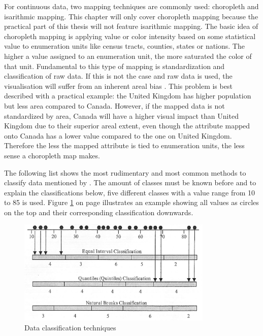 For continuous data, two mapping techniques are commonly used: choropleth and isarithmic mapping. This chapter will only cover choropleth mapping because the practical part of this thesis will not feature isarithmic mapping. The basic idea of choropleth mapping is applying value or color intensity based on some statistical value to enumeration units like census tracts, counties, states or nations. The higher a value assigned to an enumeration unit, the more saturated the color of that unit. Fundamental to this type of mapping is standardization and classification of raw data. If this is not the case and raw data is used, the visualisation will suffer from an inherent areal bias . This problem is best described with a practical example: the United Kingdom has higher population but less area compared to Canada. However, if the mapped data is not standardized by area, Canada will have a higher visual impact than United Kingdom due to their superior areal extent, even though the attribute mapped onto Canada has a lower value compared to the one on United Kingdom. Therefore the less the mapped attribute is tied to enumeration units, the less sense a choropleth map makes.

The following list shows the most rudimentary and most common methods to classify data mentioned by \citeauthor{McMaster2010}. The amount of classes must be known before and to explain the classifications below, five different classes with a value range from 10 to 85 is used. Figure \ref{fig:choropleth-classification} on page \pageref{fig:choropleth-classification} illustrates an example showing all values as circles on the top and their corresponding classification downwards.

\begin{figure}[!htb]
\centering
\includegraphics[height=5cm,keepaspectratio]{images/choropleth/classification.png}
\caption[
    Data classification techniques .
]{Data classification techniques}
\label{fig:choropleth-classification}
\end{figure}

